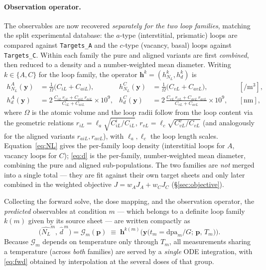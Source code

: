 \documentclass{article}
\newcommand{\param}{\bm{p}}
\newcommand{\dpa}{\mathrm{dpa}}
\newcommand{\NL}{N_{L}}
\begin{document}
\paragraph{Observation operator.}
The observables are now recovered \emph{separately for the two loop families},
matching the split experimental database: the $a$-type (interstitial, prismatic)
loops are compared against \texttt{Targets\_A} and the $c$-type (vacancy, basal)
loops against \texttt{Targets\_C}. Within each family the pure and aligned
variants are first \emph{combined}, then reduced to a density and a
number-weighted mean diameter. Writing $k\in\{A,C\}$ for the loop family, the
operator $\bm{h}^{k}=(h^{k}_{\NL},h^{k}_{d})$ is
\begin{align}
  h^{A}_{\NL}(\bm{y}) &= \frac{1}{\Omega}\big(C_{iL}+C_{aiL}\big),
  & h^{C}_{\NL}(\bm{y}) &= \frac{1}{\Omega}\big(C_{vL}+C_{avL}\big),
  &&[\si{\per\cubic\metre}], \label{eq:NL}\\[4pt]
  h^{A}_{d}(\bm{y}) &= 2\,\frac{C_{iL}\,r_{iL}+C_{aiL}\,r_{aiL}}{C_{iL}+C_{aiL}}\times 10^{9},
  & h^{C}_{d}(\bm{y}) &= 2\,\frac{C_{vL}\,r_{vL}+C_{avL}\,r_{avL}}{C_{vL}+C_{avL}}\times 10^{9},
  &&[\si{\nano\metre}], \label{eq:d}
\end{align}
where $\Omega$ is the atomic volume and the loop radii follow from the loop
content via the geometric relations
\(r_{iL}=\ell_a\sqrt{C_{iL}^{i}/C_{iL}}\),
\(r_{vL}=\ell_c\sqrt{C_{vL}^{v}/C_{vL}}\) (and analogously for the aligned
variants $r_{aiL},r_{avL}$), with $\ell_a,\ell_c$ the loop length scales.
Equation~\eqref{eq:NL} gives the per-family loop density (interstitial loops for
$A$, vacancy loops for $C$); \eqref{eq:d} is the per-family, number-weighted mean
diameter, combining the pure and aligned sub-populations. The two families are
\emph{not} merged into a single total --- they are fit against their own target
sheets and only later combined in the weighted objective $J=w_AJ_A+w_CJ_C$
(\S\ref{sec:objective}).

Collecting the forward solve, the dose mapping, and the observation operator, the
\emph{predicted} observables at condition $m$ --- which belongs to a definite
loop family $k(m)$ given by its source sheet --- are written compactly as
\begin{equation}
  \big(\widehat{\NL}^{m},\,\widehat{d}^{\,m}\big)
  =\mathcal{G}_m(\param)
  \;\equiv\;
  \bm{h}^{k(m)}\!\Big(\bm{y}\big(t_m=\dpa_m/G;\,\param,\,T_m\big)\Big).
  \label{eq:fwd}
\end{equation}
Because $\mathcal{G}_m$ depends on temperature only through $T_m$, all
measurements sharing a temperature (across \emph{both} families) are served by a
\emph{single} ODE integration, with \eqref{eq:fwd} obtained by interpolation at
the several doses of that group.
\end{document}
